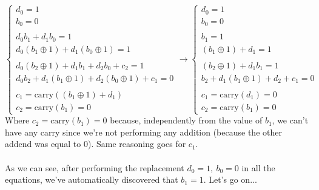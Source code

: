 \documentclass[11pt, a4paper]{article}
\begin{document}
\begin{equation*}
    \begin{cases}
        
        d_0=1\\
        b_0=0\\\\
        
        d_0b_1+d_1b_0=1\\
        d_0(b_1\oplus1)+d_1(b_0\oplus1)=1\\\\
        
        d_0(b_2\oplus1)+d_1b_1+d_2b_0+c_2=1\\
        d_0b_2+d_1(b_1\oplus1)+d_2(b_0\oplus1)+c_1=0\\\\

        c_1=\text{carry}((b_1\oplus1)+d_1)\\
        c_2=\text{carry}(b_1)=0
        
    \end{cases}\longrightarrow
    \begin{cases}
        
        d_0=1\\
        b_0=0\\\\
        
        b_1=1\\
        (b_1\oplus1)+d_1=1\\\\
        
        (b_2\oplus1)+d_1b_1=1\\
        b_2+d_1(b_1\oplus1)+d_2+c_1=0\\\\

        c_1=\text{carry}(d_1)=0\\
        c_2=\text{carry}(b_1)=0
        
    \end{cases}
\end{equation*}
Where $c_2=\text{carry}(b_1)=0$ because, independently from the value of $b_1$, we can't have any carry since we're not performing any addition (because the other addend was equal to 0). Same reasoning goes for $c_1$.\\\\
As we can see, after performing the replacement $d_0=1,\ b_0=0$ in all the equations, we've automatically discovered that $b_1=1$. Let's go on...
\end{document}
